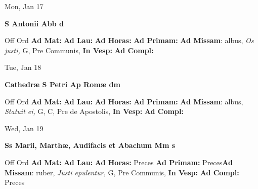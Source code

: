 \documentclass[10pt]{memoir}
\begin{document}
\begin{center}
\begin{minipage}{3.5in}
\vspace{2em}
\begin{center}Mon, Jan 17
\end{center}
\textbf{ \large S Antonii Abb
\textnormal{\normalsize d}}

\begin{justify}Off Ord
\textbf{Ad Mat: }
\textbf{Ad Lau: }
\textbf{Ad Horas: }
\textbf{Ad Primam: }\textbf{Ad Missam}: albus, \textit{Os justi,} G, Pre Communis, 
\textbf{In Vesp: }
\textbf{Ad Compl: }
\end{justify}
\end{minipage}
\end{center}

\begin{center}
\begin{minipage}{3.5in}
\vspace{2em}
\begin{center}Tue, Jan 18
\end{center}
\textbf{ \large Cathedræ S Petri Ap Romæ
\textnormal{\normalsize dm}}

\begin{justify}Off Ord
\textbf{Ad Mat: }
\textbf{Ad Lau: }
\textbf{Ad Horas: }
\textbf{Ad Primam: }\textbf{Ad Missam}: albus, \textit{Statuit ei,} G, C, Pre de Apostolis, 
\textbf{In Vesp: }
\textbf{Ad Compl: }
\end{justify}
\end{minipage}
\end{center}

\begin{center}
\begin{minipage}{3.5in}
\vspace{2em}
\begin{center}Wed, Jan 19
\end{center}
\textbf{ \large Ss Marii, Marthæ, Audifacis et Abachum Mm
\textnormal{\normalsize s}}

\begin{justify}Off Ord
\textbf{Ad Mat: }
\textbf{Ad Lau: }
\textbf{Ad Horas: }Preces
\textbf{Ad Primam: }Preces\textbf{Ad Missam}: ruber, \textit{Justi epulentur,} G, Pre Communis, 
\textbf{In Vesp: }
\textbf{Ad Compl: }Preces
\end{justify}
\end{minipage}
\end{center}
\end{document}
